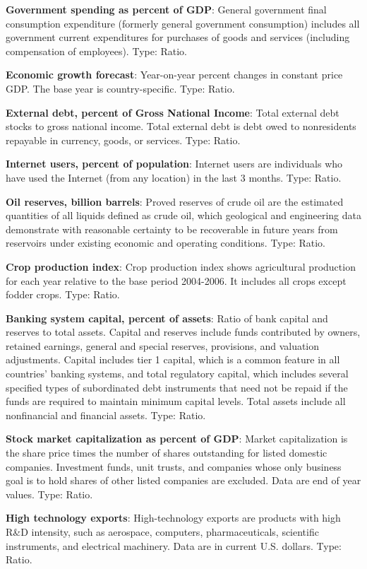 \documentclass[11pt]{article}
\begin{document}
\begin{appendices}
\textbf{Government spending as percent of GDP}: General government final consumption expenditure (formerly general government consumption) includes all government current expenditures for purchases of goods and services (including compensation of employees). Type: Ratio.

\textbf{Economic growth forecast}: Year-on-year percent changes in constant price GDP. The base year is country-specific. Type: Ratio.

\textbf{External debt, percent of Gross National Income}: Total external debt stocks to gross national income. Total external debt is debt owed to nonresidents repayable in currency, goods, or services. Type: Ratio.

\textbf{Internet users, percent of population}: Internet users are individuals who have used the Internet (from any location) in the last 3 months. Type: Ratio.

\textbf{Oil reserves, billion barrels}: Proved reserves of crude oil are the estimated quantities of all liquids defined as crude oil, which geological and engineering data demonstrate with reasonable certainty to be recoverable in future years from reservoirs under existing economic and operating conditions. Type: Ratio.

\textbf{Crop production index}: Crop production index shows agricultural production for each year relative to the base period 2004-2006. It includes all crops except fodder crops. Type: Ratio.

\textbf{Banking system capital, percent of assets}: Ratio of bank capital and reserves to total assets. Capital and reserves include funds contributed by owners, retained earnings, general and special reserves, provisions, and valuation adjustments. Capital includes tier 1 capital, which is a common feature in all countries' banking systems, and total regulatory capital, which includes several specified types of subordinated debt instruments that need not be repaid if the funds are required to maintain minimum capital levels. Total assets include all nonfinancial and financial assets. Type: Ratio.

\textbf{Stock market capitalization as percent of GDP}: Market capitalization is the share price times the number of shares outstanding for listed domestic companies. Investment funds, unit trusts, and companies whose only business goal is to hold shares of other listed companies are excluded. Data are end of year values. Type: Ratio.

\textbf{High technology exports}:  High-technology exports are products with high R\&D intensity, such as aerospace, computers, pharmaceuticals, scientific instruments, and electrical machinery. Data are in current U.S. dollars. Type: Ratio.


\end{appendices}
\end{document}
